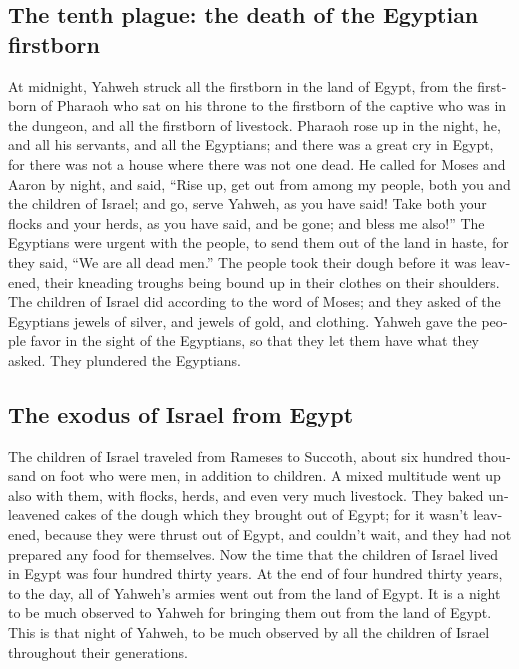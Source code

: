 \begin{paracol}{2}
\begin{otherlanguage}{english}
\hypertarget{the-tenth-plague-the-death-of-the-egyptian-firstborn}{%
\subsection{The tenth plague: the death of the Egyptian
firstborn}\label{the-tenth-plague-the-death-of-the-egyptian-firstborn}}

 At midnight, Yahweh struck all the firstborn in the land
of Egypt, from the firstborn of Pharaoh who sat on his throne to the
firstborn of the captive who was in the dungeon, and all the firstborn
of livestock.  Pharaoh rose up in the night, he, and all
his servants, and all the Egyptians; and there was a great cry in Egypt,
for there was not a house where there was not one dead. 
He called for Moses and Aaron by night, and said, ``Rise up, get out
from among my people, both you and the children of Israel; and go, serve
Yahweh, as you have said!  Take both your flocks and your
herds, as you have said, and be gone; and bless me also!''
 The Egyptians were urgent with the people, to send them
out of the land in haste, for they said, ``We are all dead men.''
 The people took their dough before it was leavened,
their kneading troughs being bound up in their clothes on their
shoulders.  The children of Israel did according to the
word of Moses; and they asked of the Egyptians jewels of silver, and
jewels of gold, and clothing.  Yahweh gave the people
favor in the sight of the Egyptians, so that they let them have what
they asked. They plundered the Egyptians.

\hypertarget{the-exodus-of-israel-from-egypt}{%
\subsection{The exodus of Israel from
Egypt}\label{the-exodus-of-israel-from-egypt}}

 The children of Israel traveled from Rameses to Succoth,
about six hundred thousand on foot who were men, in addition to
children.  A mixed multitude went up also with them, with
flocks, herds, and even very much livestock.  They baked
unleavened cakes of the dough which they brought out of Egypt; for it
wasn't leavened, because they were thrust out of Egypt, and couldn't
wait, and they had not prepared any food for themselves. 
Now the time that the children of Israel lived in Egypt was four hundred
thirty years.  At the end of four hundred thirty years,
to the day, all of Yahweh's armies went out from the land of Egypt.
 It is a night to be much observed to Yahweh for bringing
them out from the land of Egypt. This is that night of Yahweh, to be
much observed by all the children of Israel throughout their
generations.


\end{otherlanguage}
\end{paracol}
